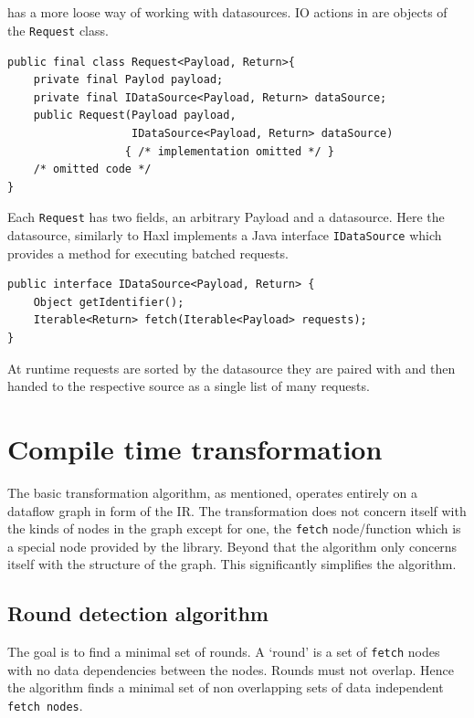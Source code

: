 \subsection{\yauhau{}}

\yauhau{} has a more loose way of working with datasources.
IO actions in \yauhau{} are objects of the \texttt{Request} class.

\begin{verbatim}
public final class Request<Payload, Return>{
    private final Paylod payload;
    private final IDataSource<Payload, Return> dataSource;
    public Request(Payload payload,
                   IDataSource<Payload, Return> dataSource)
                  { /* implementation omitted */ }
    /* omitted code */
}
\end{verbatim}

Each \texttt{Request} has two fields, an arbitrary Payload and a datasource.
Here the datasource, similarly to Haxl implements a Java interface \texttt{IDataSource} which provides a method for executing batched requests.

\begin{verbatim}
public interface IDataSource<Payload, Return> {
    Object getIdentifier();
    Iterable<Return> fetch(Iterable<Payload> requests);
}
\end{verbatim}

At runtime requests are sorted by the datasource they are paired with and then handed to the respective source as a single list of many requests.


\section{Compile time transformation}

The basic \yauhau{} transformation algorithm, as mentioned, operates entirely on a dataflow graph in form of the IR.
The transformation does not concern itself with the kinds of nodes in the graph except for one, the \texttt{fetch} node/function which is a special node provided by the \yauhau{} library.
Beyond that the algorithm only concerns itself with the structure of the graph.
This significantly simplifies the algorithm.

\subsection{Round detection algorithm}

The goal is to find a minimal set of rounds.
A `round' is a set of \texttt{fetch} nodes with no data dependencies between the nodes.
Rounds must not overlap.
Hence the algorithm finds a minimal set of non overlapping sets of data independent \texttt{fetch nodes}.

